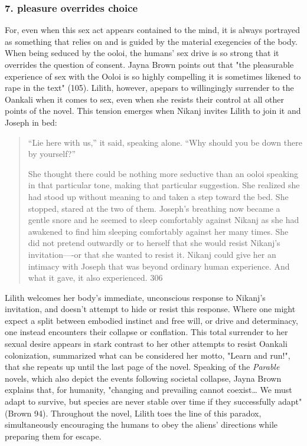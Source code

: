 \documentclass[11pt]{article}
\begin{document}
\subsubsection{7. pleasure overrides choice}
\label{sec:org4b9b962}
For, even when this sex act appears contained to the mind, it is
always portrayed as something that relies on and is guided by the
material exegencies of the body. When being seduced by the ooloi, the
humans' sex drive is so strong that it overrides the question of
consent. Jayna Brown points out that "the pleasurable experience of
sex with the Ooloi is so highly compelling it is sometimes likened to
rape in the text" (105). Lilith, however, apepars to willingingly
surrender to the Oankali when it comes to sex, even when she resists
their control at all other points of the novel. This tension emerges
when Nikanj invites Lilith to join it and Joseph in bed:
\begin{quote}
“Lie here with us,” it said, speaking alone. “Why should you be down
there by yourself?”

She thought there could be nothing more seductive than an ooloi
speaking in that particular tone, making that particular
suggestion. She realized she had stood up without meaning to and taken
a step toward the bed. She stopped, stared at the two of
them. Joseph’s breathing now became a gentle snore and he seemed to
sleep comfortably against Nikanj as she had awakened to find him
sleeping comfortably against her many times. She did not pretend
outwardly or to herself that she would resist Nikanj’s invitation—-or
that she wanted to resist it. Nikanj could give her an intimacy with
Joseph that was beyond ordinary human experience. And what it gave, it
also experienced. 306
\end{quote}
Lilith welcomes her body's immediate, unconscious response to Nikanj's
invitation, and doesn't attempt to hide or resist this response. Where
one might expect a split between embodied instinct and free will, or
drive and determinacy, one instead encounters their collapse or
conflation. This total surrender to her sexual desire appears in stark
contrast to her other attempts to resist Oankali colonization,
summarized what can be considered her motto, "Learn and run!", that
she repeats up until the last page of the novel. Speaking of the
\emph{Parable} novels, which also depict the events following societal
collapse, Jayna Brown explains that, for humanity, "changing and
prevailing cannot coexist\ldots{} We must adapt to survive, but species are
never stable over time if they successfully adapt" (Brown
94). Throughout the novel, Lilith toes the line of this paradox,
simultaneously encouraging the humans to obey the aliens' directions
while preparing them for escape.
\end{document}
